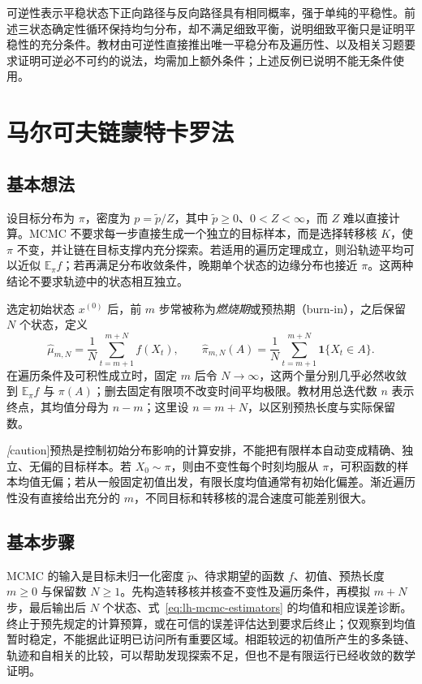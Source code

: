 可逆性表示平稳状态下正向路径与反向路径具有相同概率，强于单纯的平稳性。前述三状态确定性循环保持均匀分布，却不满足细致平衡，说明细致平衡只是证明平稳性的充分条件。教材由可逆性直接推出唯一平稳分布及遍历性、以及相关习题要求证明可逆必不可约的说法，均需加上额外条件；上述反例已说明不能无条件使用。

\section{马尔可夫链蒙特卡罗法}
\label{sec:lh-mcmc-framework}

\subsection{基本想法}
\label{subsec:lh-mcmc-idea}

设目标分布为 $\pi$，密度为 $p=\widetilde p/Z$，其中 $\widetilde p\geq0$、$0<Z<\infty$，而 $Z$ 难以直接计算。MCMC 不要求每一步直接生成一个独立的目标样本，而是选择转移核 $K$，使 $\pi$ 不变，并让链在目标支撑内充分探索。若适用的遍历定理成立，则沿轨迹平均可以近似 $\mathbb E_\pi f$；若再满足分布收敛条件，晚期单个状态的边缘分布也接近 $\pi$。这两种结论不要求轨迹中的状态相互独立。

选定初始状态 $x^{(0)}$ 后，前 $m$ 步常被称为\emph{燃烧期}或预热期（burn-in），之后保留 $N$ 个状态，定义
\begin{equation}
\widehat\mu_{m,N}=\frac1N\sum_{t=m+1}^{m+N}f(X_t),
\qquad
\widehat\pi_{m,N}(A)=\frac1N\sum_{t=m+1}^{m+N}\mathbf1\{X_t\in A\}.
\label{eq:lh-mcmc-estimators}
\end{equation}
在遍历条件及可积性成立时，固定 $m$ 后令 $N\to\infty$，这两个量分别几乎必然收敛到 $\mathbb E_\pi f$ 与 $\pi(A)$；删去固定有限项不改变时间平均极限。教材用总迭代数 $n$ 表示终点，其均值分母为 $n-m$；这里设 $n=m+N$，以区别预热长度与实际保留数。

\emph[caution]{预热是控制初始分布影响的计算安排，不能把有限样本自动变成精确、独立、无偏的目标样本。}若 $X_0\sim\pi$，则由不变性每个时刻均服从 $\pi$，可积函数的样本均值无偏；若从一般固定初值出发，有限长度均值通常有初始化偏差。渐近遍历性没有直接给出充分的 $m$，不同目标和转移核的混合速度可能差别很大。

\subsection{基本步骤}
\label{subsec:lh-mcmc-steps}

MCMC 的输入是目标未归一化密度 $\widetilde p$、待求期望的函数 $f$、初值、预热长度 $m\geq0$ 与保留数 $N\geq1$。先构造转移核并核查不变性及遍历条件，再模拟 $m+N$ 步，最后输出后 $N$ 个状态、式~\eqref{eq:lh-mcmc-estimators} 的均值和相应误差诊断。终止于预先规定的计算预算，或在可信的误差评估达到要求后终止；仅观察到均值暂时稳定，不能据此证明已访问所有重要区域。相距较远的初值所产生的多条链、轨迹和自相关的比较，可以帮助发现探索不足，但也不是有限运行已经收敛的数学证明。

